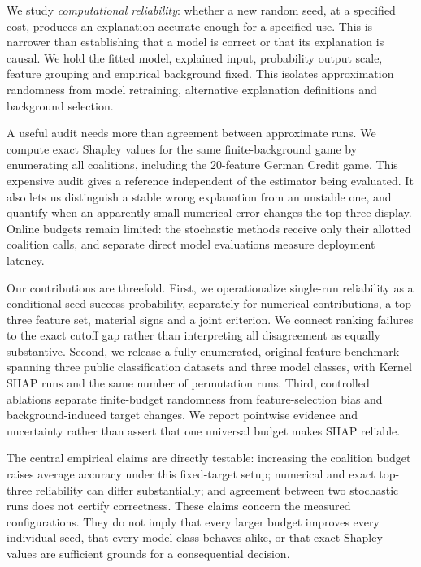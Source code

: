\documentclass{article}
\begin{document}
We study \emph{computational reliability}: whether a new random seed, at a specified cost, produces an explanation accurate enough for a specified use. This is narrower than establishing that a model is correct or that its explanation is causal. We hold the fitted model, explained input, probability output scale, feature grouping and empirical background fixed. This isolates approximation randomness from model retraining, alternative explanation definitions and background selection.

A useful audit needs more than agreement between approximate runs. We compute exact Shapley values for the same finite-background game by enumerating all coalitions, including the 20-feature German Credit game. This expensive audit gives a reference independent of the estimator being evaluated. It also lets us distinguish a stable wrong explanation from an unstable one, and quantify when an apparently small numerical error changes the top-three display. Online budgets remain limited: the stochastic methods receive only their allotted coalition calls, and separate direct model evaluations measure deployment latency.

Our contributions are threefold. First, we operationalize single-run reliability as a conditional seed-success probability, separately for numerical contributions, a top-three feature set, material signs and a joint criterion. We connect ranking failures to the exact cutoff gap rather than interpreting all disagreement as equally substantive. Second, we release a fully enumerated, original-feature benchmark spanning three public classification datasets and three model classes, with \KernelRuns{} Kernel SHAP runs and the same number of permutation runs. Third, controlled ablations separate finite-budget randomness from feature-selection bias and background-induced target changes. We report pointwise evidence and uncertainty rather than assert that one universal budget makes SHAP reliable.

The central empirical claims are directly testable: increasing the coalition budget raises average accuracy under this fixed-target setup; numerical and exact top-three reliability can differ substantially; and agreement between two stochastic runs does not certify correctness. These claims concern the measured configurations. They do not imply that every larger budget improves every individual seed, that every model class behaves alike, or that exact Shapley values are sufficient grounds for a consequential decision.
\end{document}
